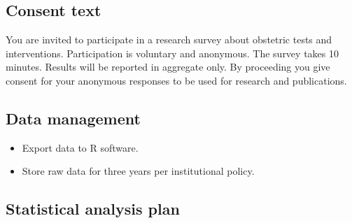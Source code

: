 \documentclass[
  letterpaper,
  DIV=11,
  numbers=noendperiod]{scrartcl}
\begin{document}
\subsection{Consent text}\label{consent-text}

You are invited to participate in a research survey about obstetric
tests and interventions. Participation is voluntary and anonymous. The
survey takes 10 minutes. Results will be reported in aggregate only. By
proceeding you give consent for your anonymous responses to be used for
research and publications.

\subsection{Data management}\label{data-management}

\begin{itemize}
\item
  Export data to R software.
\item
  Store raw data for three years per institutional policy.
\end{itemize}

\subsection{Statistical analysis plan}\label{statistical-analysis-plan}
\end{document}
